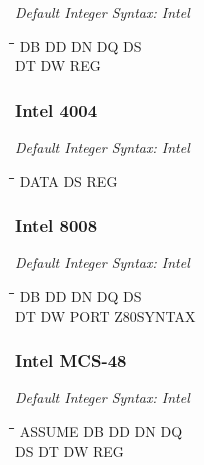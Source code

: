 {\em Default Integer Syntax: Intel}

{\tt\begin{tabbing}
\hspace{3cm}\=\hspace{3cm}\=\hspace{3cm}\=\hspace{3cm}\=\kill
DB         \> DD          \> DN          \> DQ          \> DS \\
DT         \> DW          \> REG \\
\end{tabbing}}

\subsubsection{Intel 4004}

{\em Default Integer Syntax: Intel}

{\tt\begin{tabbing}
\hspace{3cm}\=\hspace{3cm}\=\hspace{3cm}\=\hspace{3cm}\=\kill   
DATA       \> DS          \> REG \\
\end{tabbing}}

\subsubsection{Intel 8008}

{\em Default Integer Syntax: Intel}

{\tt\begin{tabbing}
\hspace{3cm}\=\hspace{3cm}\=\hspace{3cm}\=\hspace{3cm}\=\kill    
DB         \> DD          \> DN          \> DQ          \> DS \\
DT         \> DW          \> PORT        \> Z80SYNTAX   \\
\end{tabbing}}

\subsubsection{Intel MCS-48}

{\em Default Integer Syntax: Intel}

{\tt\begin{tabbing}
\hspace{3cm}\=\hspace{3cm}\=\hspace{3cm}\=\hspace{3cm}\=\kill
ASSUME     \> DB         \> DD          \> DN          \> DQ \\
DS         \> DT         \> DW          \> REG \\
\end{tabbing}}

